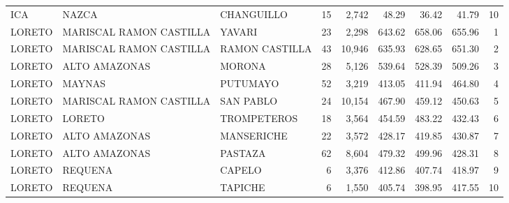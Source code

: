 \begin{table}[htbp]
{\begin{tabular}{lllrrrrrr}
ICA & NAZCA & CHANGUILLO & 15 & 2,742 & 48.29 & 36.42 & 41.79 & 10 \\
LORETO & MARISCAL RAMON CASTILLA & YAVARI & 23 & 2,298 & 643.62 & 658.06 & 655.96 & 1 \\
LORETO & MARISCAL RAMON CASTILLA & RAMON CASTILLA & 43 & 10,946 & 635.93 & 628.65 & 651.30 & 2 \\
LORETO & ALTO AMAZONAS & MORONA & 28 & 5,126 & 539.64 & 528.39 & 509.26 & 3 \\
LORETO & MAYNAS & PUTUMAYO & 52 & 3,219 & 413.05 & 411.94 & 464.80 & 4 \\
LORETO & MARISCAL RAMON CASTILLA & SAN PABLO & 24 & 10,154 & 467.90 & 459.12 & 450.63 & 5 \\
LORETO & LORETO & TROMPETEROS & 18 & 3,564 & 454.59 & 483.22 & 432.43 & 6 \\
LORETO & ALTO AMAZONAS & MANSERICHE & 22 & 3,572 & 428.17 & 419.85 & 430.87 & 7 \\
LORETO & ALTO AMAZONAS & PASTAZA & 62 & 8,604 & 479.32 & 499.96 & 428.31 & 8 \\
LORETO & REQUENA & CAPELO & 6 & 3,376 & 412.86 & 407.74 & 418.97 & 9 \\
LORETO & REQUENA & TAPICHE & 6 & 1,550 & 405.74 & 398.95 & 417.55 & 10 \\
\bottomrule
\end{tabular}%
}
\end{table}

